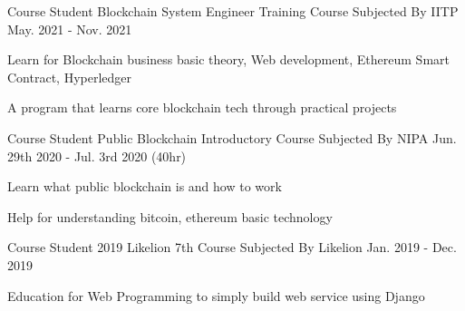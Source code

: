 

\begin{cventries}

  \cventry
    {Course Student} %
    {Blockchain System Engineer Training Course} %
    {Subjected By IITP} %
    {May. 2021 - Nov. 2021} %
    {
      \begin{cvitems} %
        \item {Learn for Blockchain business basic theory, Web development, Ethereum Smart Contract, Hyperledger}
        \item {A program that learns core blockchain tech through practical projects}
      \end{cvitems}
    }

  \cventry
    {Course Student} %
    {Public Blockchain Introductory Course} %
    {Subjected By NIPA} %
    {Jun. 29th 2020 - Jul. 3rd 2020 (40hr)} %
    {
      \begin{cvitems} %
        \item {Learn what public blockchain is and how to work}
        \item {Help for understanding bitcoin, ethereum basic technology }
      \end{cvitems}
    }
    
  \cventry
    {Course Student} %
    {2019 Likelion 7th Course} %
    {Subjected By Likelion} %
    {Jan. 2019 - Dec. 2019} %
    {
      \begin{cvitems} %
        \item {Education for Web Programming to simply build web service using Django}
      \end{cvitems}
    }


\end{cventries}
